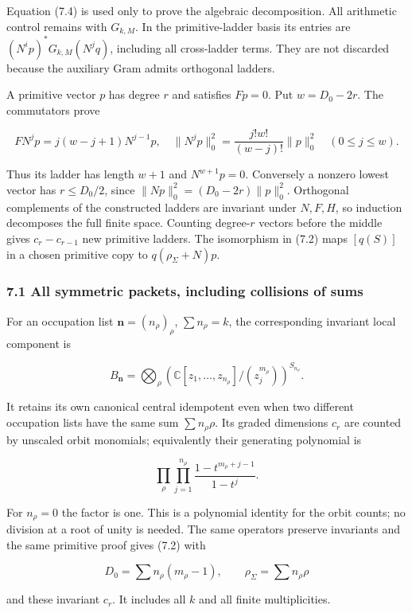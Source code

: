 \documentclass[
]{article}
\begin{document}
Equation (7.4) is used only to prove the algebraic decomposition. All
arithmetic control remains with \(G_{k,M}\). In the primitive-ladder
basis its entries are \((N^ip)^*G_{k,M}(N^jq)\), including all
cross-ladder terms. They are not discarded because the auxiliary Gram
admits orthogonal ladders.

A primitive vector \(p\) has degree \(r\) and satisfies \(Fp=0\). Put
\(w=D_0-2r\). The commutators prove

\[FN^jp=j(w-j+1)N^{j-1}p,\quad
\|N^jp\|_0^2=\frac{j!w!}{(w-j)!}\|p\|_0^2\quad(0\le j\le w).\tag{7.5}\]

Thus its ladder has length \(w+1\) and \(N^{w+1}p=0\). Conversely a
nonzero lowest vector has \(r\le D_0/2\), since
\(\|Np\|_0^2=(D_0-2r)\|p\|_0^2\). Orthogonal complements of the
constructed ladders are invariant under \(N,F,H\), so induction
decomposes the full finite space. Counting degree-\(r\) vectors before
the middle gives \(c_r-c_{r-1}\) new primitive ladders. The isomorphism
in (7.2) maps \([q(S)]\) in a chosen primitive copy to
\(q(\rho_\Sigma+N)p\).

\subsubsection{7.1 All symmetric packets, including collisions of
sums}\label{all-symmetric-packets-including-collisions-of-sums}

For an occupation list \(\mathbf n=(n_\rho)_\rho\), \(\sum n_\rho=k\),
the corresponding invariant local component is

\[B_{\mathbf n}=\bigotimes_\rho
\left(\mathbb C[z_1,\ldots,z_{n_\rho}]/(z_j^{m_\rho})\right)^{S_{n_\rho}}.\]

It retains its own canonical central idempotent even when two different
occupation lists have the same sum \(\sum n_\rho\rho\). Its graded
dimensions \(c_r\) are counted by unscaled orbit monomials; equivalently
their generating polynomial is

\[\prod_\rho\prod_{j=1}^{n_\rho}
\frac{1-t^{m_\rho+j-1}}{1-t^j}.\tag{7.6}\]

For \(n_\rho=0\) the factor is one. This is a polynomial identity for
the orbit counts; no division at a root of unity is needed. The same
operators preserve invariants and the same primitive proof gives (7.2)
with

\[D_0=\sum n_\rho(m_\rho-1),\qquad \rho_\Sigma=\sum n_\rho\rho\]

and these invariant \(c_r\). It includes all \(k\) and all finite
multiplicities.
\end{document}
